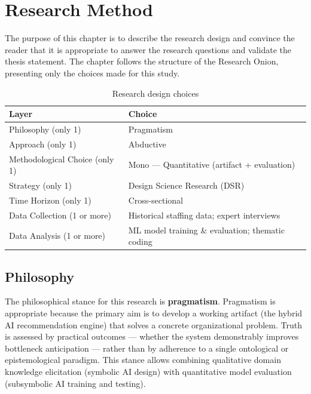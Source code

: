 \chapter{Research Method}
\label{chap:research_method}

The purpose of this chapter is to describe the research design and convince the reader that it is
appropriate to answer the research questions and validate the thesis statement. The chapter follows
the structure of the Research Onion, presenting only the choices made for this study.

\begin{table}[htbp]
  \centering
  \caption{Research design choices}
  \label{tab:research_choices}
  \begin{tabular}{@{}ll@{}}
    \toprule
    \textbf{Layer}                & \textbf{Choice} \\
    \midrule
    Philosophy (only 1)           & Pragmatism \\
    Approach (only 1)             & Abductive \\
    Methodological Choice (only 1)& Mono — Quantitative (artifact + evaluation) \\
    Strategy (only 1)             & Design Science Research (DSR) \\
    Time Horizon (only 1)         & Cross-sectional \\
    Data Collection (1 or more)   & Historical staffing data; expert interviews \\
    Data Analysis (1 or more)     & ML model training \& evaluation; thematic coding \\
    \bottomrule
  \end{tabular}
\end{table}

\section{Philosophy}
\label{sec:philosophy}

The philosophical stance for this research is \textbf{pragmatism}. Pragmatism is appropriate
because the primary aim is to develop a working artifact (the hybrid AI recommendation engine)
that solves a concrete organizational problem. Truth is assessed by practical outcomes — whether
the system demonstrably improves bottleneck anticipation — rather than by adherence to a single
ontological or epistemological paradigm. This stance allows combining qualitative domain
knowledge elicitation (symbolic AI design) with quantitative model evaluation (subsymbolic AI
training and testing).

